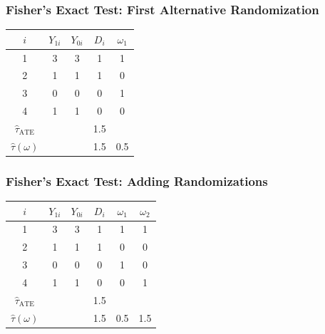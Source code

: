\documentclass[xcolor=dvipsnames]{beamer}
\begin{document}
\begin{frame}
\frametitle{Fisher's Exact Test: First Alternative Randomization}
\smallskip
\begin{tabular}{@{} c c c c !{\color{gray!50}\vrule} c @{}}
\toprule
$i$ & $Y_{1i}$ & $Y_{0i}$ & $D_i$ & $\omega_1$ \\
\midrule
{}  1 & 3 & \textcolor{red!70!black}{3} & 1 & 1 \\
                    2 & 1 & \textcolor{red!70!black}{1} & 1 & 0 \\
  3 & \textcolor{red!70!black}{0} & 0 & 0 & 1 \\
                    4 & \textcolor{red!70!black}{1} & 1 & 0 & 0 \\
\midrule
$\widehat{\tau}_{\text{ATE}}$ & & & 1.5 &  \\
$\hat\tau(\omega)$ & & & 1.5 & 0.5 \\
\bottomrule
\end{tabular}
\end{frame}

\begin{frame}
\frametitle{Fisher's Exact Test: Adding Randomizations}
\smallskip
\begin{tabular}{@{} c c c c !{\color{gray!50}\vrule} c c @{}}
\toprule
$i$ & $Y_{1i}$ & $Y_{0i}$ & $D_i$ & $\omega_1$ & $\omega_2$ \\
\midrule
{}  1 & 3 & \textcolor{red!70!black}{3} & 1 & 1 & 1 \\
                    2 & 1 & \textcolor{red!70!black}{1} & 1 & 0 & 0 \\
                    3 & \textcolor{red!70!black}{0} & 0 & 0 & 1 & 0 \\
  4 & \textcolor{red!70!black}{1} & 1 & 0 & 0 & 1 \\
\midrule
$\widehat{\tau}_{\text{ATE}}$ & & & 1.5 &  &  \\
$\hat\tau(\omega)$ & & & 1.5 & 0.5 & 1.5 \\
\bottomrule
\end{tabular}
\end{frame}
\end{document}
